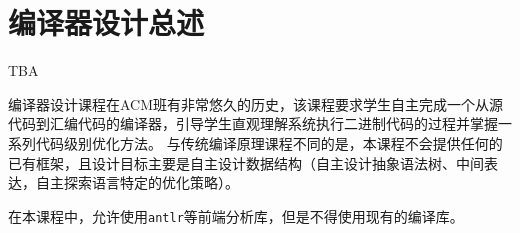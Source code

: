 \chapter{编译器设计总述}
\begin{introduction}
    \item TBA
\end{introduction}

编译器设计课程在ACM班有非常悠久的历史，该课程要求学生自主完成一个从源代码到汇编代码的编译器，引导学生直观理解系统执行二进制代码的过程并掌握一系列代码级别优化方法。
与传统编译原理课程不同的是，本课程不会提供任何的已有框架，且设计目标主要是自主设计数据结构（自主设计抽象语法树、中间表达，自主探索语言特定的优化策略）。

\begin{remark}
    在本课程中，允许使用\texttt{antlr}等前端分析库，但是不得使用现有的编译库。
\end{remark}